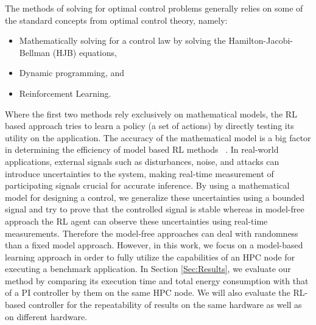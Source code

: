 \iffalse 
The methods of solving for optimal control problems generally relies on some of the standard concepts from optimal control theory, namely:
\begin{itemize}
\item Mathematically solving for a control law by solving the Hamilton-Jacobi-Bellman (HJB) equations, 
\item Dynamic programming, and 
\item Reinforcement Learning. 
\end{itemize}
Where the first two methods rely exclusively on mathematical models, the RL based approach tries to learn a policy (a set of actions) by directly testing its utility on the application. The accuracy of the mathematical model is a big factor in determining the efficiency of model based RL methods ~\cite{ke2019learning}.
In real-world applications, external signals such as disturbances, noise, and attacks can introduce uncertainties to the system, making real-time measurement of participating signals crucial for accurate inference.
By using a mathematical model for designing a control, we generalize these uncertainties using a bounded signal and try to prove that the controlled signal is stable whereas in model-free approach the RL agent can observe these uncertainties using real-time measurements. Therefore the model-free approaches can deal with randomness than a fixed model approach. 
However, in this work, we focus on a model-based learning approach in order to fully utilize the capabilities of an HPC node for executing a benchmark application. In Section \ref{Sec:Results}, we evaluate our method by comparing its execution time and total energy consumption with that of a PI controller by them on the same HPC node. We will also evaluate the RL-based controller for the repeatability of results on the same hardware as well as on different hardware.

